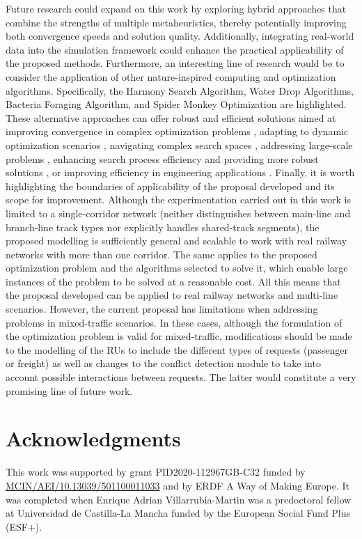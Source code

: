\documentclass[Afour,sagev,times]{sagej}
\begin{document}
Future research could expand on this work by exploring hybrid approaches that combine the strengths of multiple metaheuristics, thereby potentially improving both convergence speeds and solution quality. Additionally, integrating real-world data into the simulation framework could enhance the practical applicability of the proposed methods. Furthermore, an interesting line of research would be to consider the application of other nature-inspired computing and optimization algorithms. Specifically, the Harmony Search Algorithm, Water Drop Algorithms, Bacteria Foraging Algorithm, and Spider Monkey Optimization are highlighted. These alternative approaches can offer robust and efficient solutions aimed at improving convergence in complex optimization problems \cite{Siddique15}, adapting to dynamic optimization scenarios \cite{Siddique14a}, navigating complex search spaces \cite{Wang18}, addressing large-scale problems \cite{Akhand20}, enhancing search process efficiency and providing more robust solutions \cite{Siddique14b}, or improving efficiency in engineering applications \cite{Siddique16}. Finally, it is worth highlighting the boundaries of applicability of the proposal developed and its scope for improvement. Although the experimentation carried out in this work is limited to a single-corridor network (neither distinguishes between main-line and branch-line track types nor explicitly handles shared-track segments), the proposed modelling is sufficiently general and scalable to work with real railway networks with more than one corridor. The same applies to the proposed optimization problem and the algorithms selected to solve it, which enable large instances of the problem to be solved at a reasonable cost. All this means that the proposal developed can be applied to real railway networks and multi-line scenarios. However, the current proposal has limitations when addressing problems in mixed-traffic scenarios. In these cases, although the formulation of the optimization problem is valid for mixed-traffic, modifications should be made to the modelling of the \glspl{RU} to include the different types of requests (passenger or freight) as well as changes to the conflict detection module to take into account possible interactions between requests. The latter would constitute a very promising line of future work.

\section*{Acknowledgments}
This work was supported by grant PID2020-112967GB-C32 funded by \url{MCIN/AEI/10.13039/501100011033} and by ERDF A Way of Making Europe. It was completed when Enrique Adrian Villarrubia-Martin was a predoctoral fellow at Universidad de Castilla-La Mancha funded by the European Social Fund Plus (ESF+).


\end{document}
